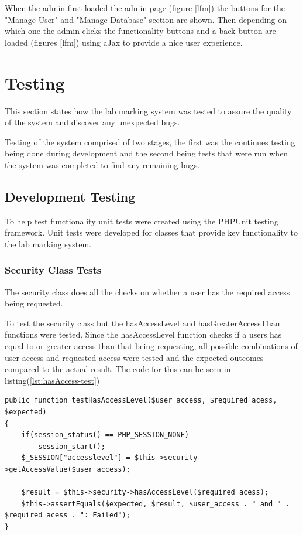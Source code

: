 \documentclass[12pt]{article}  %
\begin{document}
When the admin first loaded the admin page (figure [lfm]) the buttons for the "Manage User" and "Manage Database" section are shown. Then depending on which one the admin clicks the functionality buttons and a back button are loaded (figures [lfm]) using aJax to provide a nice user experience. 







\newpage
\section{Testing}

This section states how the lab marking system was tested to assure the quality of the system and discover any unexpected bugs.

Testing of the system comprised of two stages, the first was the continues testing being done during development and the second being tests that were run when the system was completed to find any remaining bugs.


\subsection{Development Testing}
To help test functionality unit tests were created using the PHPUnit testing framework. Unit tests were developed for classes that provide key functionality to the lab marking system. 

\subsubsection{Security Class Tests}

The security class does all the checks on whether a user has the required access being requested. 

To test the security class but the hasAccessLevel and hasGreaterAccessThan functions were tested. Since the hasAccessLevel function checks if a users has equal to or greater access than that being requesting, all possible combinations of user access and requested access were tested and the expected outcomes compared to the actual result. The code for this can be seen in listing(\ref{lst:hasAccess-test})

\singlespacing
\begin{lstlisting}[caption= hasAccessLevel Function Test, label = lst:hasAccess-test]
public function testHasAccessLevel($user_access, $required_acess, $expected)
{
    if(session_status() == PHP_SESSION_NONE)
        session_start();
    $_SESSION["accesslevel"] = $this->security->getAccessValue($user_access);

    $result = $this->security->hasAccessLevel($required_acess);
    $this->assertEquals($expected, $result, $user_access . " and " . $required_acess . ": Failed");
}
\end{lstlisting}
\doublespacing
\end{document}

